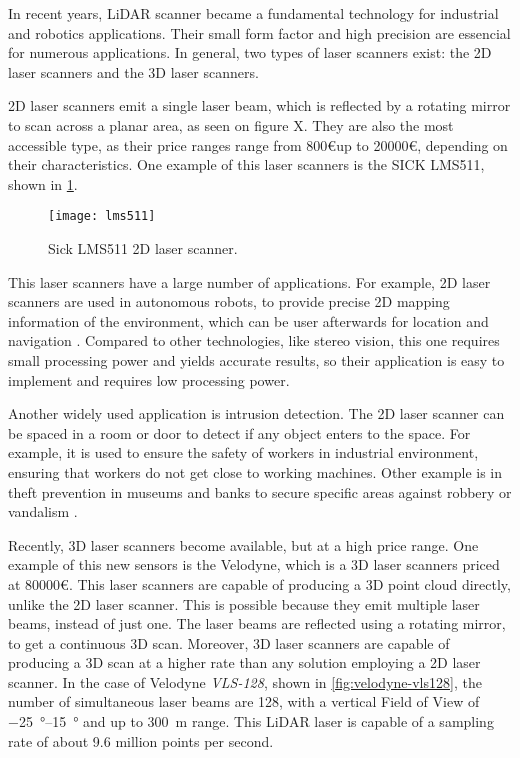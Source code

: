 In recent years, LiDAR scanner became a fundamental technology for industrial and robotics applications. Their small form factor and high precision are essencial for numerous applications. In general, two types of laser scanners exist: the 2D laser scanners and the 3D laser scanners. 

2D laser scanners emit a single laser beam, which is reflected by a rotating mirror to scan across a planar area, as seen on figure X. They are also the most accessible type, as their price ranges range from \num{800}\euro up to \num{20000}\euro, depending on their characteristics. One example of this laser scanners is the SICK LMS511, shown in \cref{fig:sick-lms511}. 

\begin{figure}
    \centering
    \texttt{[image: lms511]}
    \caption{Sick LMS511 2D laser scanner.}
    \label{fig:sick-lms511}
\end{figure}

This laser scanners have a large number of applications. For example, 2D laser scanners are used in autonomous robots, to provide precise 2D mapping information of the environment, which can be user afterwards for location and navigation \cite{siritanawan17}. Compared to other technologies, like stereo vision, this one requires small processing power and yields accurate results, so their application is easy to implement and requires low processing power. 

Another widely used application is intrusion detection. The 2D laser scanner can be spaced in a room or door to detect if any object enters to the space. For example, it is used to ensure the safety of workers in industrial environment, ensuring that workers do not get close to working machines. Other example is in theft prevention in museums and banks to secure specific areas against robbery or vandalism \cite{sick-security}.

Recently, 3D laser scanners become available, but at a high price range. One example of this new sensors is the Velodyne, which is a 3D laser scanners priced at \num{80000}\euro. This laser scanners are capable of producing a 3D point cloud directly, unlike the 2D laser scanner. This is possible because they emit multiple laser beams, instead of just one. The laser beams are reflected using a rotating mirror, to get a continuous 3D scan. Moreover, 3D laser scanners are capable of producing a 3D scan at a higher rate than any solution employing a 2D laser scanner. In the case of Velodyne \emph{VLS-128}, shown in \cref{fig:velodyne-vls128}, the number of simultaneous laser beams are \num{128}, with a vertical Field of View of \SIrange{-25}{+15}{\degree} and up to \SI{300}{\meter} range\cite{velodyne-vls128}. This LiDAR laser is capable of a sampling rate of about 9.6 million points per second.

